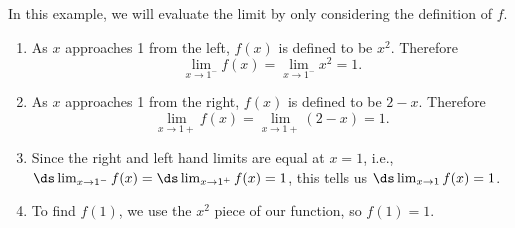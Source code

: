 {In this example, we will evaluate the limit by only considering the definition of $f$.
\begin{enumerate}
	\item	As $x$ approaches 1 from the left, $f(x)$ is defined to be $x^2$. Therefore \[\lim_{x\to1^-} f(x)=\lim_{x\to1^-} x^2=1.\]
	\item	As $x$ approaches 1 from the right, $f(x)$ is defined to be $2-x$. Therefore \[\lim_{x\to 1+} f(x)=\lim_{x\to 1+}(2-x)=1.\]
	\item	Since the right and left hand limits are equal at $x=1$, i.e., $\ds \lim_{x\to1^-} f(x)=\ds \lim_{x\to1^+} f(x)=1$, this tells us $\ds \lim_{x\to1} f(x)=1$.
	\item	To find $f(1)$, we use the $x^2$ piece of our function, so $f(1)=1$.\eoehere
\end{enumerate}}


